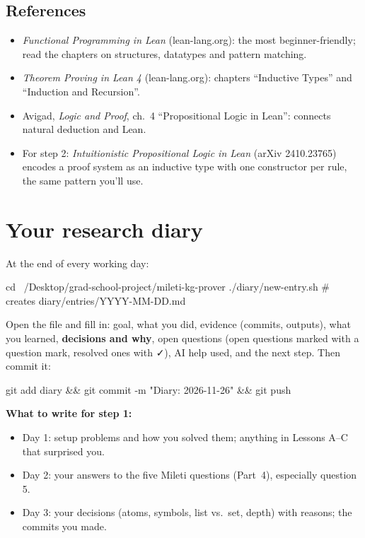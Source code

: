 \documentclass[11pt,a4paper]{article}
\begin{document}
\subsection{References}
\begin{itemize}
\item \emph{Functional Programming in Lean} (lean-lang.org): the most beginner-friendly; read the chapters on structures, datatypes and pattern matching.
\item \emph{Theorem Proving in Lean 4} (lean-lang.org): chapters ``Inductive Types'' and ``Induction and Recursion''.
\item Avigad, \emph{Logic and Proof}, ch.~4 ``Propositional Logic in Lean'': connects natural deduction and Lean.
\item For step 2: \emph{Intuitionistic Propositional Logic in Lean} (arXiv 2410.23765) encodes a proof system as an inductive type with one constructor per rule, the same pattern you'll use.
\end{itemize}

\section{Your research diary}
At the end of every working day:
\begin{shell}
cd ~/Desktop/grad-school-project/mileti-kg-prover
./diary/new-entry.sh          # creates diary/entries/YYYY-MM-DD.md
\end{shell}
Open the file and fill in: goal, what you did, evidence (commits, outputs), what you learned, \textbf{decisions and why}, open questions (open questions marked with a question mark, resolved ones with ✓), AI help used, and the next step. Then commit it:
\begin{shell}
git add diary && git commit -m "Diary: 2026-11-26" && git push
\end{shell}
\textbf{What to write for step 1:}
\begin{itemize}
\item Day 1: setup problems and how you solved them; anything in Lessons A--C that surprised you.
\item Day 2: your answers to the five Mileti questions (Part~4), especially question 5.
\item Day 3: your decisions (atoms, symbols, list vs.\ set, depth) with reasons; the commits you made.
\end{itemize}
\end{document}
